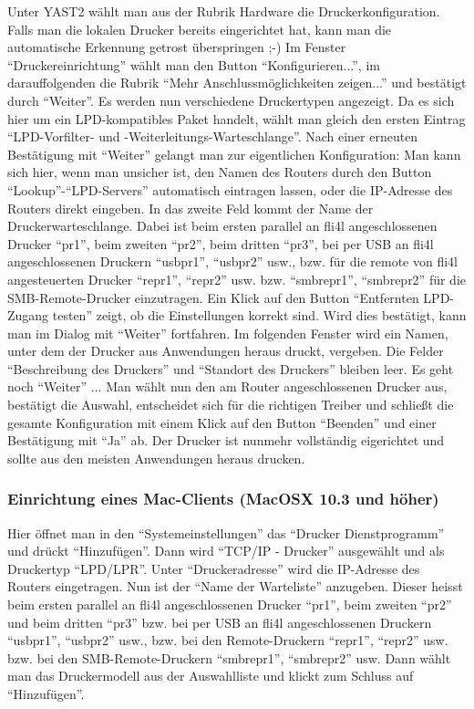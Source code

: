 Unter YAST2 wählt man aus der Rubrik Hardware die Druckerkonfiguration.
Falls man die lokalen Drucker bereits eingerichtet hat, kann man die
automatische Erkennung getrost überspringen ;-)
Im Fenster ``Druckereinrichtung'' wählt man den Button ``Konfigurieren...'', im
darauffolgenden die Rubrik ``Mehr Anschlussmöglichkeiten zeigen...'' und
bestätigt durch ``Weiter''.
Es werden nun verschiedene Druckertypen angezeigt.
Da es sich hier um ein LPD-kompatibles Paket handelt, wählt man gleich den
ersten Eintrag ``LPD-Vorfilter- und -Weiterleitungs-Warteschlange''.
Nach einer erneuten Bestätigung mit ``Weiter'' gelangt man zur eigentlichen
Konfiguration:
Man kann sich hier, wenn man unsicher ist, den Namen des Routers durch den
Button ``Lookup''-``LPD-Servers'' automatisch eintragen lassen, oder die
IP-Adresse des Routers direkt eingeben.
In das zweite Feld kommt der Name der Druckerwarteschlange.
Dabei ist beim ersten parallel an fli4l angeschlossenen Drucker ``pr1'', beim
zweiten ``pr2'', beim dritten ``pr3'', bei per USB an fli4l
angeschlossenen Druckern ``usbpr1'', ``usbpr2'' usw., bzw. für die remote von
fli4l angesteuerten Drucker ``repr1'', ``repr2'' usw. bzw. ``smbrepr1'',
``smbrepr2'' für die SMB-Remote-Drucker einzutragen.
Ein Klick auf den Button ``Entfernten LPD-Zugang testen'' zeigt, ob die
Einstellungen korrekt sind. Wird dies bestätigt, kann man im Dialog mit
``Weiter'' fortfahren.
Im folgenden Fenster wird ein Namen, unter dem der Drucker aus Anwendungen
heraus druckt, vergeben. Die Felder ``Beschreibung des Druckers'' und ``Standort
des Druckers'' bleiben leer. Es geht noch ``Weiter'' ...
Man wählt nun den am Router angeschlossenen Drucker aus, bestätigt die Auswahl,
entscheidet sich für die richtigen Treiber und schließt die gesamte
Konfiguration mit einem Klick auf den Button ``Beenden'' und einer Bestätigung
mit ``Ja'' ab.
Der Drucker ist nunmehr vollständig eigerichtet und sollte aus den meisten
Anwendungen heraus drucken.

\subsubsection{Einrichtung eines Mac-Clients (MacOSX 10.3 und höher)}


    Hier öffnet man in den ``Systemeinstellungen'' das ``Drucker Dienstprogramm''
    und drückt ``Hinzufügen''. Dann wird ``TCP/IP - Drucker'' ausgewählt und
    als Druckertyp ``LPD/LPR''. Unter ``Druckeradresse'' wird die IP-Adresse des
    Routers eingetragen. Nun ist der ``Name der Warteliste'' anzugeben.
    Dieser heisst beim ersten parallel an fli4l angeschlossenen Drucker ``pr1'',
    beim zweiten ``pr2'' und beim dritten ``pr3'' bzw. bei per USB an fli4l
    angeschlossenen Druckern ``usbpr1'', ``usbpr2'' usw., bzw. bei den
    Remote-Druckern ``repr1'', ``repr2'' usw. bzw. bei den SMB-Remote-Druckern
    ``smbrepr1'', ``smbrepr2'' usw.
    Dann wählt man das Druckermodell aus der Auswahlliste und klickt zum Schluss
    auf ``Hinzufügen''.

